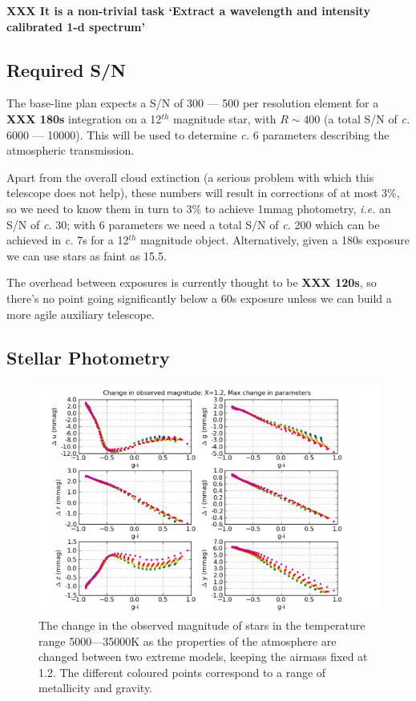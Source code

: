 \documentclass[12pt]{article}
\renewcommand{\c}{\textit{c.}\xspace}
\newcommand{\ie}{\textit{i.e.}\xspace}
\newcommand{\XXX}[1]{\textbf{XXX #1}\xspace}
\begin{document}
\XXX{It is a non-trivial task `Extract a wavelength and intensity calibrated 1-d spectrum'}

\subsection{Required S/N}

The base-line plan expects a S/N of 300 --- 500 per resolution element for a \XXX{180s} integration on a
12$^{th}$ magnitude star, with $R \sim 400$ (a total S/N of \c 6000 --- 10000).  This will be used to
determine \c 6 parameters describing the atmospheric transmission.

Apart from the overall cloud extinction (a serious problem with which this telescope does not help), these
numbers will result in corrections of at most 3\%, so we need to know them in turn to 3\% to achieve 1mmag
photometry, \ie an S/N of \c 30; with 6 parameters we need a total S/N of \c 200 which can be achieved in \c
7s for a 12$^{th}$ magnitude object.  Alternatively, given a 180s exposure we can use stars as faint as 15.5.

The overhead between exposures is currently thought to be \XXX{120s}, so there's no point going significantly
below a 60s exposure unless we can build a more agile auxiliary telescope.

\subsection{Stellar Photometry}
\label{secStellarPhotometry}

\begin{figure}
\begin{center}
\includegraphics[width=14cm]{maxAtmosphereDeltas}
\end{center}
\caption{
  \label{figMaxAtmosphereDeltas}
  The change in the observed magnitude of stars in the temperature range 5000---35000K as the properties
  of the atmosphere are changed between two extreme models, keeping the airmass fixed at 1.2.  The different
  coloured points correspond to a range of metallicity and gravity.
  }
\end{figure}
\end{document}
